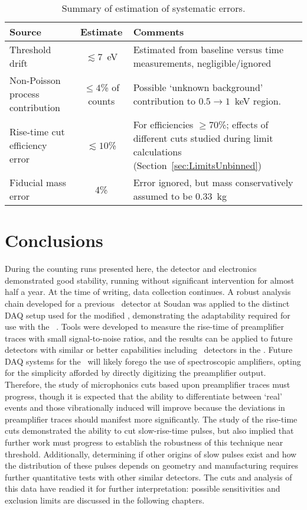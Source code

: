 			\begin{table} 
				\centering
				\begin{tabular}{p{}  c  p{}  } 
				\toprule
					Source & Estimate & Comments \\
				\midrule	
					Threshold drift & $\lesssim7$~eV & Estimated from baseline versus time measurements, negligible/ignored \\
					Non-Poisson process contribution & $\leq4$\% of counts & Possible `unknown background' contribution to $0.5\to1$~keV region.  \\			
					Rise-time cut efficiency error & $\lesssim10$\% & For efficiencies $\geq$70\%; effects of different cuts studied during limit calculations (Section~\ref{sec:LimitsUnbinned}) \\
					Fiducial mass error & 4\% & Error ignored, but mass conservatively assumed to be 0.33~kg\\

				\bottomrule
				\end{tabular}	
				\caption{Summary of estimation of systematic errors.}
				\label{tab:BeGeSysErrors}
			\end{table}
	\section{Conclusions}
     	\label{sec:BeGeConclusions}		
	
	During the counting runs presented here, the detector and electronics demonstrated good stability, running without significant intervention for almost half a year.  At the time of writing, data collection continues.  A robust analysis chain developed for a previous \ppc~detector at Soudan was applied to the distinct DAQ setup used for the modified \bege, demonstrating the adaptability required for use with the \MJ~\minmod.  Tools were developed to measure the rise-time of preamplifier traces with small signal-to-noise ratios, and the results can be applied to future detectors with similar or better capabilities including \ppc~detectors in the \minmod.  Future DAQ systems for the \minmod~will likely forego the use of spectroscopic amplifiers, opting for the simplicity afforded by directly digitizing the preamplifier output.  Therefore, the study of microphonics cuts based upon preamplifier traces must progress, though it is expected that the ability to differentiate between `real' events and those vibrationally induced will improve because the deviations in preamplifier traces should manifest more significantly.  The study of the rise-time cuts demonstrated the ability to cut slow-rise-time pulses, but also implied that further work must progress to establish the robustness of this technique near threshold.  Additionally, determining if other origins of slow pulses exist and how the distribution of these pulses depends on geometry and manufacturing requires further quantitative tests with other similar detectors.  The cuts and analysis of this data have readied it for further interpretation: possible sensitivities and exclusion limits are discussed in the following chapters.
